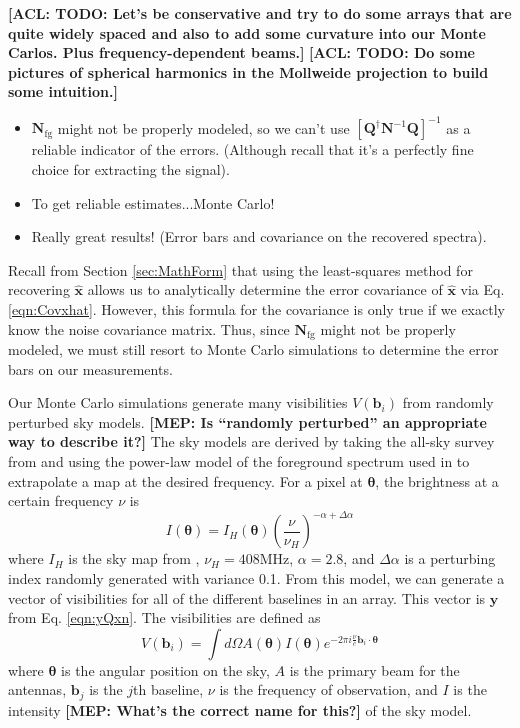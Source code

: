 \documentclass[twolcolumn,apj]{emulateapj}
\newcommand{\xhat}{\hat{\mathbf{x}}}
\newcommand{\y}{\mathbf{y}}
\newcommand{\Nfg}{\mathbf{N}_{\textrm{fg}}}
\newcommand{\acl}[1]{{\color{red} \textbf{[ACL:  #1]}}}
\newcommand{\mep}[1]{{\color{applegreen} \textbf{[MEP:  #1]}}}
\begin{document}
\acl{TODO: Let's be conservative and try to do some arrays that are quite widely spaced and also to add some curvature into our Monte Carlos.  Plus frequency-dependent beams.}
\acl{TODO: Do some pictures of spherical harmonics in the Mollweide projection to build some intuition.}

\begin{itemize}
\item $\mathbf{N}_\textrm{fg}$ might not be properly modeled, so we can't use $[\mathbf{Q}^\dagger \mathbf{N}^{-1} \mathbf{Q}]^{-1}$ as a reliable indicator of the errors.  (Although recall that it's a perfectly fine choice for extracting the signal).
\item To get reliable estimates...Monte Carlo!
\item Really great results! (Error bars and covariance on the recovered spectra).
\end{itemize}

Recall from Section \ref{sec:MathForm} that using the least-squares method for recovering $\xhat$ allows us to analytically determine the error covariance of $\xhat$ via Eq. \eqref{eqn:Covxhat}. However, this formula for the covariance is only true if we exactly know the noise covariance matrix. Thus, since $\Nfg$ might not be properly modeled, we must still resort to Monte Carlo simulations to determine the error bars on our measurements. 

Our Monte Carlo simulations generate many visibilities $V(\mathbf{b}_i)$ from randomly perturbed sky models. \mep{Is ``randomly perturbed'' an appropriate way to describe it?} The sky models are derived by taking the all-sky survey from \citet{Haslam_408MHz_map} and using the power-law model of the foreground spectrum used in \citet{Liu_21cm_Fg} to extrapolate a map at the desired frequency. For a pixel at $\boldsymbol \theta$, the brightness at a certain frequency $\nu$ is 
\begin{equation}
I(\boldsymbol \theta) = I_H(\boldsymbol \theta) \left ( \frac{\nu}{\nu_H} \right ) ^{-\alpha + \Delta \alpha}
\end{equation}
where $I_H$ is the sky map from \citet{Haslam_408MHz_map}, $\nu_H=408$MHz, $\alpha = 2.8$, and $\Delta \alpha$ is a perturbing index randomly generated with variance 0.1. From this model, we can generate a vector of visibilities for all of the different baselines in an array. This vector is $\y$ from Eq. \eqref{eqn:yQxn}. The visibilities are defined as 
\begin{equation}
V(\mathbf{b}_i) = \int d \Omega A(\boldsymbol \theta) I(\boldsymbol \theta) e^{-2\pi i\frac{\nu}{c} \mathbf{b}_i \cdot \boldsymbol \theta}
\end{equation}
where $\boldsymbol \theta$ is the angular position on the sky, $A$ is the primary beam for the antennas, $\mathbf{b_{\textit{j}}}$ is the $j$th baseline, $\nu$ is the frequency of observation, and $I$ is the intensity \mep{What's the correct name for this?} of the sky model. 
\end{document}

